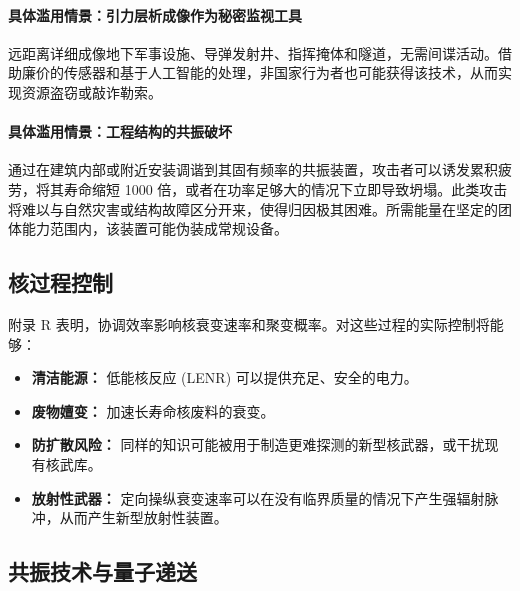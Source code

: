 \documentclass[12pt,a4paper]{article}
\theoremstyle{remark}
\begin{document}
	\paragraph{具体滥用情景：引力层析成像作为秘密监视工具}
	远距离详细成像地下军事设施、导弹发射井、指挥掩体和隧道，无需间谍活动。借助廉价的传感器和基于人工智能的处理，非国家行为者也可能获得该技术，从而实现资源盗窃或敲诈勒索。
	
	\paragraph{具体滥用情景：工程结构的共振破坏}
	通过在建筑内部或附近安装调谐到其固有频率的共振装置，攻击者可以诱发累积疲劳，将其寿命缩短 1000 倍，或者在功率足够大的情况下立即导致坍塌。此类攻击将难以与自然灾害或结构故障区分开来，使得归因极其困难。所需能量在坚定的团体能力范围内，该装置可能伪装成常规设备。
	
	\subsection{核过程控制}
	\label{subsec:nuclear}
	
	附录 R 表明，协调效率影响核衰变速率和聚变概率。对这些过程的实际控制将能够：
	\begin{itemize}[leftmargin=*]
		\item \textbf{清洁能源：} 低能核反应 (LENR) 可以提供充足、安全的电力。
		\item \textbf{废物嬗变：} 加速长寿命核废料的衰变。
		\item \textbf{防扩散风险：} 同样的知识可能被用于制造更难探测的新型核武器，或干扰现有核武库。
		\item \textbf{放射性武器：} 定向操纵衰变速率可以在没有临界质量的情况下产生强辐射脉冲，从而产生新型放射性装置。
	\end{itemize}
	
	\subsection{共振技术与量子递送}
	\label{subsec:resonance}
	
\end{document}
